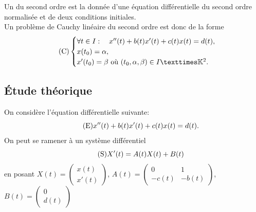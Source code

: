 \documentclass{book}
\begin{document}
\begin{Definition}
Un  du second ordre
est la donnée d'une équation différentielle du second ordre
normalisée et de deux conditions initiales.\\
Un problème de Cauchy linéaire du second ordre est donc de la forme
\[\tag{$\mathrm{C}$}
  \begin{cases}
    \forall t\in I:\quad x''(t) + b(t)x'(t) + c(t) x(t) = d(t), \\
    x(t_0) =\alpha , \\
    x'(t_0) =\beta \text{ où } (t_0,\alpha,\beta)\in I×\K^2.
\end{cases}\]
\end{Definition}
\subsection{Étude théorique}
\begin{Remarque}
On considère l'équation différentielle suivante:
\[\tag{$\mathrm{E}$} x''(t) + b(t) x'(t) + c(t) x(t) = d(t).\]
On peut se ramener à un système différentiel
\[\tag{$\mathrm{S}$} X'(t) = A(t) X(t) + B(t)\]
en posant
$X(t) = \begin{pmatrix} x(t) \\ x'(t) \end{pmatrix}$,
$A(t) = \begin{pmatrix} 0 & 1 \\ -c(t) & -b(t) \end{pmatrix}$,
$B(t) = \begin{pmatrix} 0 \\ d(t) \end{pmatrix}$
\end{Remarque}
\end{document}
